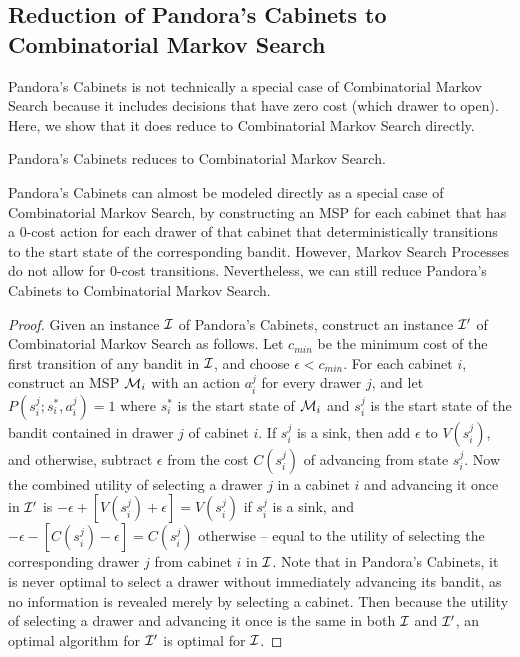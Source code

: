 \subsection{Reduction of Pandora's Cabinets to Combinatorial Markov Search}

Pandora's Cabinets is not technically a special case of Combinatorial Markov Search because it includes decisions that have zero cost (which drawer to open).
Here, we show that it does reduce to Combinatorial Markov Search directly.

\begin{proposition}
Pandora's Cabinets reduces to Combinatorial Markov Search.
\end{proposition}
Pandora's Cabinets can almost be modeled directly as a special case of Combinatorial Markov Search,
by constructing an MSP for each cabinet that has a 0-cost action for each drawer of that cabinet that deterministically transitions to the start state of the corresponding bandit.
However, Markov Search Processes do not allow for 0-cost transitions.
Nevertheless, we can still reduce Pandora's Cabinets to Combinatorial Markov Search.
\begin{proof}
Given an instance $\mathcal{I}$ of Pandora's Cabinets, construct an instance $\mathcal{I}'$ of Combinatorial Markov Search as follows.
Let $c_{min}$ be the minimum cost of the first transition of any bandit in $\mathcal{I}$, and choose $\epsilon < c_{min}$.
For each cabinet $i$, construct an MSP $\mathcal{M}_i$ with an action $a_i^j$ for every drawer $j$, and let $P(s_i^j;s_i^*,a_i^j)=1$ where $s_i^*$ is the start state of $\mathcal{M}_i$
and $s_i^j$ is the start state of the bandit contained in drawer $j$ of cabinet $i$. If $s_i^j$ is a sink, then add $\epsilon$ to $V(s_i^j)$, and otherwise, subtract $\epsilon$
from the cost $C(s_i^j)$ of advancing from state $s_i^j$.
Now the combined utility of selecting a drawer $j$ in a cabinet $i$ and advancing it once in $\mathcal{I}'$ is
$-\epsilon+[V(s_i^j)+\epsilon]=V(s_i^j)$ if $s_i^j$ is a sink, and $-\epsilon-[C(s_i^j)-\epsilon]=C(s_i^j)$ otherwise --
equal to the utility of selecting the corresponding drawer $j$ from cabinet $i$ in $\mathcal{I}$.
Note that in Pandora's Cabinets, it is never optimal to select a drawer without immediately advancing its bandit, as no information is revealed merely by selecting a cabinet.
Then because the utility of selecting a drawer and advancing it once is the same in both $\mathcal{I}$ and $\mathcal{I}'$, an optimal algorithm for $\mathcal{I}'$ is optimal for $\mathcal{I}$.
\end{proof}
